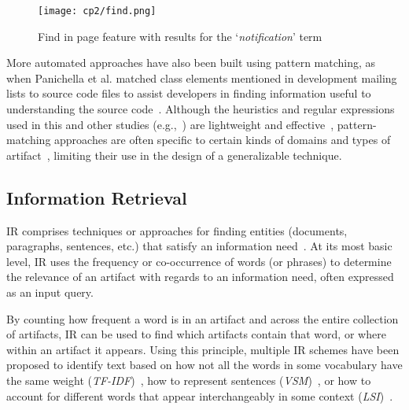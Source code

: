 \medskip
\begin{figure}[h!]
    \centering
    \texttt{[image: cp2/find.png]}
    \caption{Find in page feature with results for the `\textit{notification}' term}
    \label{fig:find-in-page}
\end{figure}


More automated approaches have also been built using pattern matching, 
as when Panichella et al. 
matched class elements mentioned in development mailing 
 lists to source code files
to assist developers in finding information useful to 
 understanding the source code~\cite{panichella2012}.
Although the heuristics and regular expressions used in this and other studies (e.g.,~\cite{nadi2020, Maalej2013})
are lightweight and effective~\cite{Bavota2016}, 
pattern-matching approaches 
are often specific to certain kinds of domains and types of artifact~\cite{fucci2019}, 
limiting their use in the design of a generalizable technique.






\subsection{Information Retrieval }
\label{cp2:information-retrieval}


\acf{IR} comprises techniques
or approaches for finding entities (documents, paragraphs, sentences, etc.)
that satisfy an information need~\cite{manning2010IR}.
At its most basic level, 
\acs{IR}
uses the 
frequency or co-occurrence of words (or phrases) to determine the relevance
of an artifact with regards to an information need, often expressed as an input query.


By counting how frequent  a word is in 
an artifact and across the entire collection of artifacts, 
\acs{IR} can be used to find which artifacts contain that word, or where within an artifact it appears. 
Using this principle, multiple \acs{IR} schemes have been proposed 
to identify text based on 
how not all the words in some vocabulary have the same weight (\textit{TF-IDF})~\cite{luhn1957tf, jones2004idf}, 
how to  represent sentences (\textit{VSM})~\cite{Salton1975vsm}, 
or how to account for different words that appear interchangeably in some context (\textit{LSI})~\cite{dumais1994latent}.



